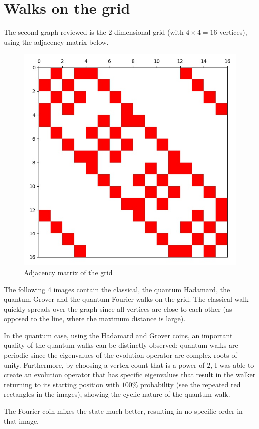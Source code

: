 \section{Walks on the grid}

The second graph reviewed is the 2 dimensional grid (with $4\times{}4=16$ vertices), using the adjacency matrix below.

\begin{figure}[H]
\centering
\includegraphics[width=0.5\linewidth]{./figures/results/grid/graph.jpg}
\caption{Adjacency matrix of the grid}
\end{figure}

The following 4 images contain the classical, the quantum Hadamard, the quantum Grover and the quantum Fourier walks on the grid. The classical walk quickly spreads over the graph since all vertices are close to each other (as opposed to the line, where the maximum distance is large).

In the quantum case, using the Hadamard and Grover coins, an important quality of the quantum walks can be distinctly observed: quantum walks are periodic since the eigenvalues of the evolution operator are complex roots of unity. Furthermore, by choosing a vertex count that is a power of $2$, I was able to create an evolution operator that has specific eigenvalues that result in the walker returning to its starting position
with $100\%$ probability (see the repeated red rectangles in the images), showing the cyclic nature of the quantum walk.

The Fourier coin mixes the state much better, resulting in no specific order in that image.

